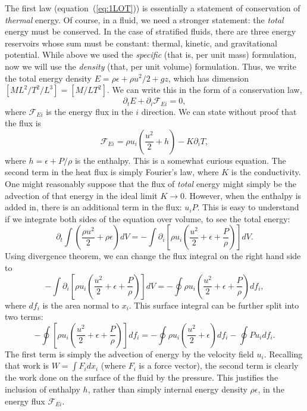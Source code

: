 \documentclass[letterpaper,12pt]{paper}
\begin{document}
The first law (equation~(\ref{eq:1LOT})) is essentially a statement of
conservation of \emph{thermal} energy. Of course, in a fluid, we need
a stronger statement: the \emph{total} energy must be conserved. In
the case of stratified fluids, there are three energy reservoirs whose
sum must be constant: thermal, kinetic, and gravitational
potential. While above we used the \emph{specific} (that is, per unit
mass) formulation, now we will use the \emph{density} (that, per unit
volume) formulation. Thus, we write the total energy density
$E = \rho \epsilon + \rho u^2/2 + g z$, which has dimension $\left[ M
  L^2/T^2/L^3 \right] = \left[ M / L T^2 \right]$. We can write this in the form
of a conservation law,
\begin{equation}
  \label{eq:energy_conservation}
  \partial_t E  + \partial_i \mathcal{F}_{Ei} = 0,
\end{equation}
where $\mathcal{F}_{Ei}$ is the energy flux in the $i$
direction. We can state without proof that the flux is 
\begin{equation}
  \label{eq:energy_flux}
  \mathcal{F}_{Ei} = \rho u_i \left(\frac{u^2}{2} + h \right) -
  K \partial_i T,
\end{equation}
where $h = \epsilon + P/\rho$ is the enthalpy. This is a somewhat
curious equation. The second term in the heat flux is simply Fourier's
law, where $K$ is the conductivity. One might reasonably suppose that
the flux of \emph{total} energy might simply be the advection of that energy
in the ideal limit $K \rightarrow 0$. However, when the enthalpy is
added in, there is an additional term in the flux: $u_i P$. This is
easy to understand if we integrate both sides of the equation over
volume, to see the total energy:
\begin{equation}
  \label{eq:total_energy}
  \partial_t \int \left(\frac{\rho u^2}{2} + \rho \epsilon \right) dV =
  - \int \partial_i \left[ \rho u_i \left( \frac{u^2}{2} + \epsilon + \frac{P}{\rho} \right)
  \right] dV.
\end{equation}
Using divergence theorem, we can change the flux integral on the right
hand side to 
\begin{equation}
  \label{eq:flux_int}
  - \int \partial_i \left[ \rho u_i \left( \frac{u^2}{2} + \epsilon + \frac{P}{\rho} \right)
  \right] dV  = - \oint \rho u_i \left( \frac{u^2}{2} + \epsilon + \frac{P}{\rho} \right)
  df_i,
\end{equation}
where $df_i$ is the area normal to $x_i$. This surface integral can be
further split into two terms:
\begin{equation}
  \label{eq:surf_int}
    - \oint \left[ \rho u_i \left( \frac{u^2}{2} + \epsilon + \frac{P}{\rho} \right)
  \right] df_i = -\oint \rho u_i \left( \frac{u^2}{2} + \epsilon
  \right) df_i - \oint P u_i df_i.
\end{equation}
The first term is simply the advection of energy by the velocity field
$u_i$. Recalling that work is $W = \int F_i dx_i$ (where $F_i$ is a
force vector), the second term is clearly the work done on the surface
of the fluid by the pressure. This justifies the inclusion of enthalpy
$h$, rather than simply internal energy density $\rho \epsilon$, in
the energy flux $\mathcal{F}_{Ei}$.
\end{document}
